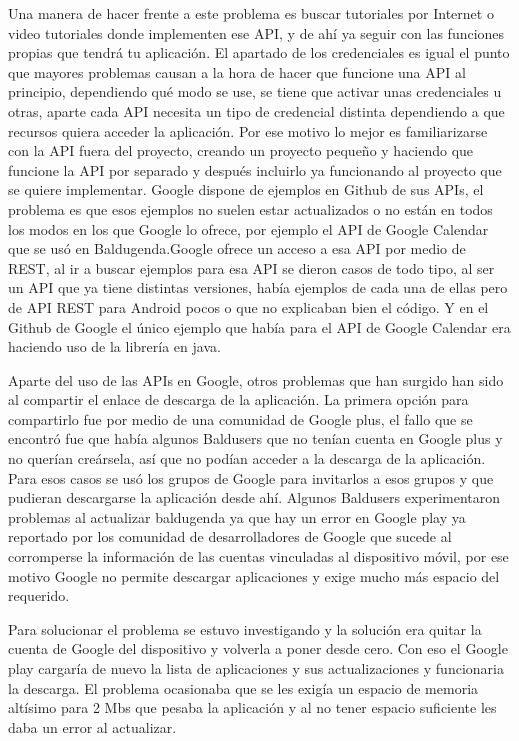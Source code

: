 Una manera de hacer frente a este problema es buscar tutoriales por Internet o video tutoriales donde implementen ese API, y de ahí ya seguir con las funciones propias que tendrá tu aplicación.
El apartado de los credenciales es igual el punto que mayores problemas causan a la hora de hacer que funcione una API al principio, dependiendo qué modo se use, se tiene que activar unas credenciales u otras, aparte cada API necesita un tipo de credencial distinta dependiendo a que recursos quiera acceder la aplicación.
Por ese motivo lo mejor es familiarizarse con la API fuera del proyecto, creando un proyecto pequeño y haciendo que funcione la API por separado y después incluirlo ya funcionando al proyecto que se quiere implementar.
Google dispone de ejemplos en Github de sus APIs, el problema es que esos ejemplos no suelen estar actualizados o no están en todos los modos en los que Google lo ofrece, por ejemplo el API de Google Calendar que se usó en Baldugenda.Google ofrece un acceso a esa API por medio de REST, al ir a buscar ejemplos para esa API se dieron casos de todo tipo, al ser un API que ya tiene distintas versiones, había ejemplos de cada una de ellas pero  de API REST para Android pocos o que no explicaban bien el código. Y en el Github de Google el único ejemplo que había para el API de Google Calendar era haciendo uso de la librería en java.

Aparte del uso de las APIs en Google, otros problemas que han surgido han sido al compartir el enlace de descarga de la aplicación.
La primera opción para compartirlo fue por medio de una comunidad de Google plus,  el fallo que se encontró fue que había algunos Baldusers que no tenían cuenta en Google plus y no querían creársela, así que no podían acceder a la descarga de la aplicación.
Para esos casos se usó los grupos de Google para invitarlos a esos grupos y que pudieran descargarse la aplicación desde ahí.
Algunos Baldusers experimentaron problemas al actualizar baldugenda ya que hay un error en Google play ya reportado por los comunidad de desarrolladores de Google que sucede al corromperse la información de las cuentas vinculadas al dispositivo móvil, por ese motivo Google no permite descargar aplicaciones y exige mucho más espacio del requerido.

Para solucionar el problema se estuvo investigando y la solución era quitar la cuenta de Google del dispositivo y volverla a poner desde cero.
Con eso el Google play cargaría de nuevo la lista de aplicaciones y sus actualizaciones y funcionaria la descarga.
El problema ocasionaba que se les exigía un espacio de memoria altísimo para 2 Mbs que pesaba la aplicación y al no tener espacio suficiente les daba un error al actualizar.


